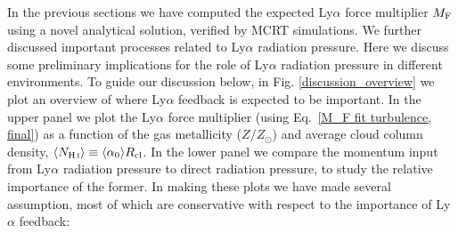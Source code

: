 \documentclass[fleqn,usenatbib]{mnras}
\newcommand\HI{\ion{H}{I}\xspace} %
\begin{document}
In the previous sections we have computed the expected Ly$\alpha$ force multiplier $M_{\rm F}$ using a novel analytical solution, verified by MCRT simulations. We further discussed important processes related to Ly$\alpha$ radiation pressure. Here we discuss some preliminary implications for the role of Ly$\alpha$ radiation pressure in different environments. To guide our discussion below, in Fig. \ref{discussion_overview} we plot an overview of where Ly$\alpha$ feedback is expected to be important. In the upper panel we plot the Ly$\alpha$ force multiplier (using Eq.~\ref{M_F fit turbulence, final}) as a function of the gas metallicity ($Z/Z_{\odot}$) and average cloud \HI column density, $\langle N_{\HI} \rangle \equiv \langle \alpha_0 \rangle R_{\rm cl}$. In the lower panel we compare the momentum input from Ly$\alpha$ radiation pressure to direct radiation pressure, to study the relative importance of the former. In making these plots we have made several assumption, most of which are conservative with respect to the importance of Ly$\alpha$ feedback: 
\end{document}
